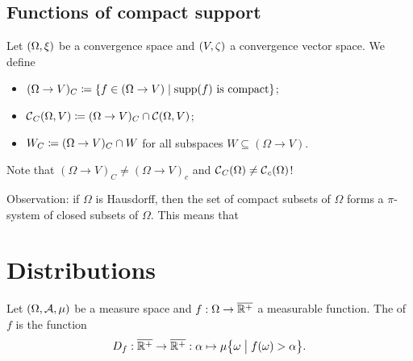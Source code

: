 \subsection{Functions of compact support}
\begin{definition}
Let $\left( \Omega, \xi \right)$ be a convergence space and $\left( V,\zeta \right)$ a convergence vector space. We define
\begin{itemize}
\item $(\Omega\to V)_C \defeq \setbuilder{f\in (\Omega\to V)}{\text{$\supp(f)$ is compact}}$;
\item $\operatorname{\mathcal{C}}_C(\Omega,V) \coloneqq (\Omega\to V)_C \cap \operatorname{\mathcal{C}}(\Omega, V)$;
\item $W_C \coloneqq (\Omega\to V)_C \cap W$ for all subspaces $W\subseteq (\Omega\to V)$.
\end{itemize}
\end{definition}
Note that $(\Omega\to V)_C \neq (\Omega\to V)_c$ and $\operatorname{\mathcal{C}}_C(\Omega) \neq \operatorname{\mathcal{C}}_c(\Omega)$!

Observation: if $\Omega$ is Hausdorff, then the set of compact subsets of $\Omega$ forms a $\pi$-system of closed subsets of $\Omega$. This means that

\section{Distributions}
\begin{definition}
Let $\left( \Omega, \mathcal{A}, \mu \right)$ be a measure space and $f: \Omega\to \overline{\mathbb{R}^+}$ a measurable function. The  of $f$ is the function
\[ D_f: \overline{\R^+}\to \overline{\R^+}: \alpha \mapsto \mu\setbuilder[\big]{\omega}{f(\omega)>\alpha}.  \]
\end{definition}

